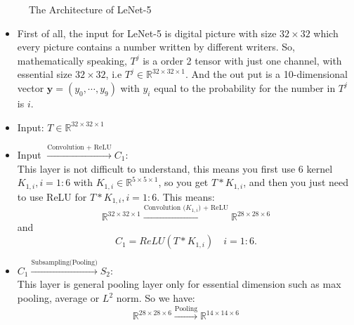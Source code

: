 \begin{figure}[!htb]
	\caption{The Architecture of LeNet-5}      
	\label{LeNet-5}
\end{figure}

\begin{itemize}
\item First of all, the input for LeNet-5 is digital picture with size $32 \times 32$ which every picture contains a number written by different writers. So, mathematically speaking, $T^j$ is a order 2 tensor with just one channel, with essential size $32 \times 32$, i.e $T^j \in \mathbb{R}^{32 \times 32 \times 1}$.  And the out put is a 10-dimensional vector $\bm y = (y_0, \cdots, y_9)$ with $y_i$ equal to the probability for the number in $T^j$ is $i$. 

\item Input: $T \in  \mathbb{R}^{32 \times 32 \times 1}$

\item Input $\xrightarrow{\text{Convolution + ReLU}} C_1$: \\
This layer is not difficult to understand, this means you first use $6$ kernel $K_{1,i}, i = 1:6$ with $K_{1,i} \in  \mathbb{R}^{5 \times 5 \times 1}$, so you get $T\ast K_{1,i}$, and then you just need to use ReLU for $T \ast K_{1,i}, i=1:6$. This means:
\begin{equation}
\mathbb{R}^{32 \times 32 \times 1}  \xrightarrow{\text{Convolution ($K_{1,i}$) + ReLU}} \mathbb{R}^{28\times 28 \times 6} 
\end{equation}
and
\begin{equation}
C_1 = ReLU(T\ast K_{1,i}) \quad i = 1:6.
\end{equation}

\item $C_1 \xrightarrow{\text{Subsampling(Pooling)}} S_2$: \\
This layer is general pooling layer only for essential dimension such as max pooling, average or $L^2$ norm. So we have:
\begin{equation}
\mathbb{R}^{28\times 28 \times 6} \xrightarrow{\text{Pooling}} \mathbb{R}^{14\times 14 \times 6}
\end{equation}


\end{itemize}
